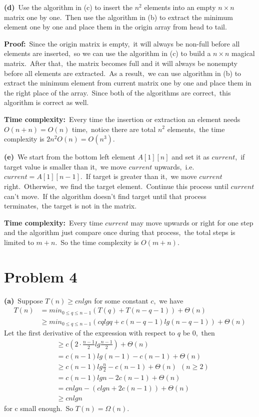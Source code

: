 \documentclass[]{article}
\begin{document}
	\textbf{(d)}\ Use the algorithm in (c) to insert the $n^2$ elements into an empty $n\times n$ matrix one by one.\ Then use the algorithm in (b) to extract the minimum element one by one and place them in the origin array from head to tail. 
	
	\textbf{Proof:}\ Since the origin matrix is empty,\ it will always be non-full before all elements are inserted,\ so we can use the algorithm in (c) to build a $n\times n$ magical matrix.\ After that,\ the matrix becomes full and it will always be nonempty before all elements are extracted.\ As a result,\ we can use algorithm in (b) to extract the minimum element from current matrix one by one and place them in the right place of the array.\ Since both of the algorithms are correct,\ this algorithm is correct as well.
	
	\textbf{Time complexity:}\ Every time the insertion or extraction an element needs $O(n+n) = O(n)$ time,\ notice there are total $n^2$ elements,\  the time complexity is $2n^2O(n) = O(n^3)$.
	
	\textbf{(e)}\ We start from the bottom left element $A[1][n]$ and set it as $current$,\ if target value is smaller than it,\ we move $current$ upwards,\ i.e.\ $current = A[1][n-1]$.\ If target is greater than it,\ we move $current$ right.\ Otherwise,\ we find the target element.\ Continue this process until $current$ can't move.\ If the algorithm doesn't find target until that process terminates,\ the target is not in the matrix.
	
	\textbf{Time complexity:}\ Every time $current$ may move upwards or right for one step and the algorithm just compare once during that process,\ the total steps is limited to $m+n$.\ So the time complexity is $O(m+n)$.
	
	\section{Problem 4}
	\textbf{(a)}\ Suppose $T(n)\geq cnlgn$ for some constant $c$,\ we have 
	\begin{equation*}
		\begin{aligned}
		T(n) &= min_{0\leq q\leq n-1}(T(q) + T(n-q-1)) + \Theta(n)\\
		&\geq min_{0\leq q\leq n-1}(cqlgq + c(n-q-1)lg(n-q-1)) + \Theta(n)
		\end{aligned}
	\end{equation*}  
	Let the first derivative of the expression with respect to $q$ be $0$,\ then
	\begin{equation*}
	\begin{aligned}
	&\geq c(2\cdot \frac{n-1}{2}lg\frac{n-1}{2}) + \Theta(n)\\
	&= c(n-1)lg(n-1) - c(n-1) + \Theta(n)\\
	&\geq c(n-1)lg\frac{n}{2} - c(n-1) + \Theta(n)\ \ (n\geq 2)\\
	&= c(n-1)lgn - 2c(n-1) + \Theta(n)\\
	&= cnlgn - (clgn + 2c(n-1)) + \Theta(n)\\
	&\geq cnlgn
	\end{aligned}
	\end{equation*}  
	for c small enough.\ So $T(n) = \Omega(n)$.
	
\end{document}
